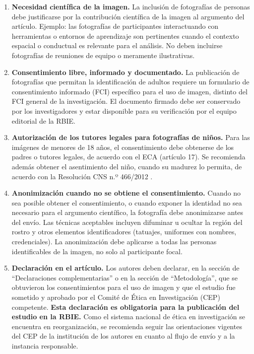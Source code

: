 \documentclass[spanish]{rbie2026}%
\begin{document}
\begin{enumerate}
  \item \textbf{Necesidad científica de la imagen.} La inclusión de fotografías de personas debe justificarse por la contribución científica de la imagen al argumento del artículo. Ejemplo: las fotografías de participantes interactuando con herramientas o entornos de aprendizaje son pertinentes cuando el contexto espacial o conductual es relevante para el análisis. No deben incluirse fotografías de reuniones de equipo o meramente ilustrativas.

  \item \textbf{Consentimiento libre, informado y documentado.} La publicación de fotografías que permitan la identificación de adultos requiere un formulario de consentimiento informado (FCI) específico para el uso de imagen, distinto del FCI general de la investigación. El documento firmado debe ser conservado por los investigadores y estar disponible para su verificación por el equipo editorial de la RBIE.

  \item \textbf{Autorización de los tutores legales para fotografías de niños.} Para las imágenes de menores de 18 años, el consentimiento debe obtenerse de los padres o tutores legales, de acuerdo con el ECA (artículo 17). Se recomienda además obtener el asentimiento del niño, cuando su madurez lo permita, de acuerdo con la Resolución CNS n.º 466/2012 \citep{cns2012resolucao466}.

  \item \textbf{Anonimización cuando no se obtiene el consentimiento.} Cuando no sea posible obtener el consentimiento, o cuando exponer la identidad no sea necesario para el argumento científico, la fotografía debe anonimizarse antes del envío. Las técnicas aceptables incluyen difuminar u ocultar la región del rostro y otros elementos identificadores (tatuajes, uniformes con nombres, credenciales). La anonimización debe aplicarse a todas las personas identificables de la imagen, no solo al participante focal.

  \item \textbf{Declaración en el artículo.} Los autores deben declarar, en la sección de ``Declaraciones complementarias'' o en la sección de ``Metodología'', que se obtuvieron los consentimientos para el uso de imagen y que el estudio fue sometido y aprobado por el Comité de Ética en Investigación (CEP) competente. \textbf{Esta declaración es obligatoria para la publicación del estudio en la RBIE.} Como el sistema nacional de ética en investigación se encuentra en reorganización, se recomienda seguir las orientaciones vigentes del CEP de la institución de los autores en cuanto al flujo de envío y a la instancia responsable.


\end{enumerate}
\end{document}
